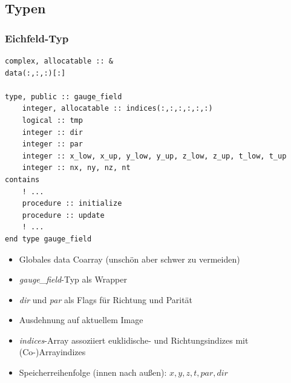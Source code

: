 \documentclass[10pt]{beamer}
\begin{document}
\subsection*{Typen}


\begin{frame}[fragile]
    \frametitle{Eichfeld-Typ}
\begin{minipage}{0.48\linewidth}
\begin{lstlisting}
complex, allocatable :: &
data(:,:,:)[:]

type, public :: gauge_field
    integer, allocatable :: indices(:,:,:,:,:,:)
    logical :: tmp
    integer :: dir
    integer :: par
    integer :: x_low, x_up, y_low, y_up, z_low, z_up, t_low, t_up
    integer :: nx, ny, nz, nt
contains
    ! ...
    procedure :: initialize
    procedure :: update
    ! ...
end type gauge_field
\end{lstlisting}
\end{minipage}
    \hfill
    \begin{minipage}{0.48\linewidth}
        \begin{itemize}
            \item Globales data Coarray (unschön aber schwer zu vermeiden)
            \item \emph{gauge\_field}-Typ als Wrapper
            \item \emph{dir} und \emph{par} als Flags für Richtung und Parität
            \item Ausdehnung auf aktuellem Image
            \item \emph{indices}-Array assoziiert euklidische- und Richtungsindizes mit (Co-)Arrayindizes
            \item Speicherreihenfolge (innen nach außen): $x,y,z,t,par,dir$
        \end{itemize}
    \end{minipage}
\end{frame}

\end{document}
